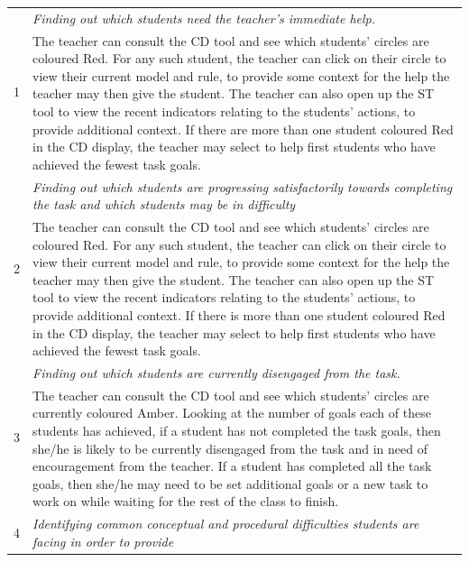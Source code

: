 \begin{table}[htbp]
  \begin{tabular}{|p{0.5cm}|p{12.5cm}|}
  \hline \multirow{2}{*}{1} & \emph{Finding out which students need
    the teacher's
    immediate help.} \\
  \cline{2-2} & The teacher can consult the CD tool and see which
  students’ circles are coloured Red. For any such student, the
  teacher can click on their circle to view their current model and
  rule, to provide some context for the help the teacher may then give
  the student. The teacher can also open up the ST tool to view the
  recent indicators relating to the students’ actions, to provide
  additional context. If there are more than one student coloured Red
  in the CD display, the teacher may select to help first students who
  have achieved the fewest
  task goals. \\
  \hline \multirow{2}{*}{2} & \emph{Finding out which students are
    progressing satisfactorily towards completing the task and which
    students may be in
    difficulty} \\
  \cline{2-2} 
  & The teacher can consult the CD tool and see which
  students' circles are coloured Red. For any such student, the
  teacher can click on their circle to view their current model and
  rule, to provide some context for the help the teacher may then give
  the student. The teacher can also open up the ST tool to view the
  recent indicators relating to the students' actions, to provide
  additional context. If there is more than one student coloured Red
  in the CD display, the teacher may select to help first students who
  have achieved the fewest
  task goals. \\
  \hline \multirow{2}{*}{3} & \emph{Finding out which students are
    currently disengaged from the task.} \\
  \cline{2-2} 
  & The teacher can consult the CD tool and see which students'
  circles are currently coloured Amber. Looking at the number of goals
  each of these students has achieved, if a student has not completed
  the task goals, then she/he is likely to be currently disengaged
  from the task and in need of encouragement from the teacher. If a
  student has completed all the task goals, then she/he may need to be
  set additional goals or a new task to work on while waiting for the
  rest of the class to finish. \\
  \hline \multirow{2}{*}{4} & \emph{Identifying common conceptual and
    procedural difficulties students are facing in order to provide
}
\end{tabular}
\end{table}
